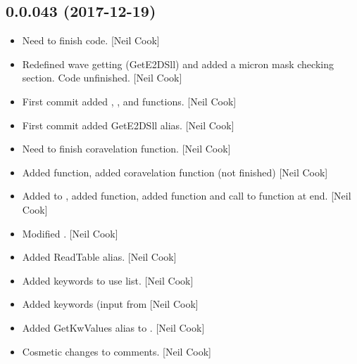 \documentclass[a4paper,10pt,english]{report}
\begin{document}
\subsection{0.0.043 (2017-12-19)}
\label{\detokenize{misc/changelog:id509}}\begin{itemize}
\item {} 
Need to finish code. {[}Neil Cook{]}

\item {} 
Redefined wave getting (GetE2DSll) and added a micron mask checking
section. Code unfinished. {[}Neil Cook{]}

\item {} 
First commit added , , and
 functions. {[}Neil Cook{]}

\item {} 
First commit added GetE2DSll alias. {[}Neil Cook{]}

\item {} 
Need to finish coravelation function. {[}Neil Cook{]}

\item {} 
Added  function, added coravelation function (not
finished) {[}Neil Cook{]}

\item {} 
Added to , added  function, added 
function and call to function at end. {[}Neil Cook{]}

\item {} 
Modified . {[}Neil Cook{]}

\item {} 
Added ReadTable alias. {[}Neil Cook{]}

\item {} 
Added keywords to use list. {[}Neil Cook{]}

\item {} 
Added  keywords (input from  {[}Neil Cook{]}

\item {} 
Added GetKwValues alias to . {[}Neil Cook{]}

\item {} 
Cosmetic changes to comments. {[}Neil Cook{]}

\end{itemize}
\end{document}
